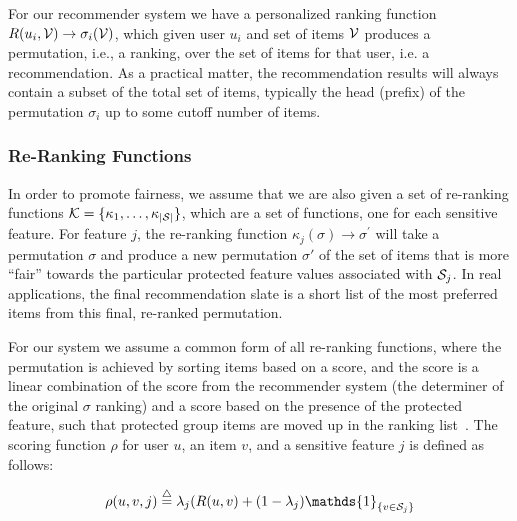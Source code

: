 For our recommender system we have a personalized ranking function $R(u_i, \mathcal{V}) \rightarrow \sigma_i(\mathcal{V})$, which given user $u_i$ and set of items $\mathcal{V}$ produces a permutation, i.e., a ranking, over the set of items for that user, i.e. a recommendation. As a practical matter, the recommendation results will always contain a subset of the total set of items, typically the head (prefix) of the permutation $\sigma_i$ up to some cutoff number of items.

\subsubsection{\textbf{Re-Ranking Functions}}
\hfill

In order to promote fairness, we assume that we are also given a set of re-ranking functions $\mathcal{K} = \{\kappa_1, \ldots, \kappa_{|\mathcal{S}|}\}$, which are a set of functions, one for each sensitive feature. For feature $j$, the re-ranking function $\kappa_j(\sigma) \rightarrow \sigma^{\prime}$ will take a permutation $\sigma$ and produce a new permutation $\sigma'$ of the set of items that is more ``fair'' towards the particular protected feature values associated with $\mathcal{S}_j$. In real applications, the final recommendation slate is a short list of the most preferred items from this final, re-ranked permutation. 

For our system we assume a common form of all re-ranking functions, where the permutation is achieved by sorting items based on a score, and the score is a linear combination of the score from the recommender system (the determiner of the original $\sigma$ ranking) and a score based on the presence of the protected feature, such that protected group items are moved up in the ranking list~\cite{adomavicius2009improving}. The scoring function $\rho$ for user $u$, an item $v$, and a sensitive feature $j$ is defined as follows:

\begin{equation}
    \rho(u, v, j) \buildrel\triangle\over= \lambda_j  (R(u,v) + (1 - \lambda_j) \mathds{1}_{\{v \in \sensitive_j\}}
\end{equation}


